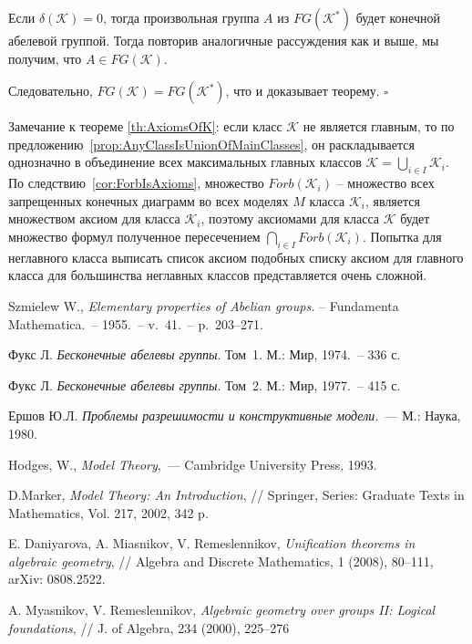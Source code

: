 \documentclass[a4paper,11pt,twoside]{article}
\def\K{{\mathcal{K}}}
\begin{document}
Если $\delta(\K) = 0$, тогда произвольная группа $A$ из $FG(\K^*)$ будет конечной абелевой группой. Тогда повторив аналогичные рассуждения как и выше, мы получим, что $A \in FG(\K)$.

Следовательно, $FG(\K) = FG(\K^*)$, что и доказывает теорему. $\square$

Замечание к теореме \ref{th:AxiomsOfK}: если класс $\K$ не является главным, то по предложению~\ref{prop:AnyClassIsUnionOfMainClasses}, он раскладывается однозначно в объединение всех максимальных главных классов $\K = \bigcup\limits_{i \in I} \K_i$. По следствию~\ref{cor:ForbIsAxioms}, множество $Forb(\K_i)$ -- множество всех запрещенных конечных диаграмм во всех моделях $M$ класса $\K_i$, является множеством аксиом для класса $\K_i$, поэтому аксиомами для класса $\K$ будет множество формул полученное пересечением $\bigcap\limits_{i \in I} Forb(\K_i)$. Попытка для неглавного класса выписать список аксиом подобных списку аксиом для главного класса для большинства неглавных классов представляется очень сложной.

\begin{thebibliography}{}

 Szmielew W., \textit{Elementary properties of Abelian groups.} -- Fundamenta Mathematica.~-- 1955.~-- v.~41.~-- p.~203--271.

 Фукс Л. \textit{Бесконечные абелевы группы}. Том~1. М.: Мир, 1974.~-- 336 с.

 Фукс Л. \textit{Бесконечные абелевы группы}. Том~2. М.: Мир, 1977.~-- 415 с.

 Ершов Ю.Л. \textit{Проблемы разрешимости и конструктивные модели.}~--- М.: Наука, 1980.

 Hodges, W., \textit{Model Theory},~--- Cambridge University Press, 1993. 

 D.Marker, \textit{Model Theory: An Introduction}, // Springer, Series: Graduate Texts in Mathematics, Vol. 217, 2002, 342 p.

 E. Daniyarova, A. Miasnikov, V. Remeslennikov, \textit{Unification theorems in algebraic geometry}, // Algebra and Discrete Mathematics, 1 (2008), 80--111, arXiv: 0808.2522.

 A. Myasnikov, V. Remeslennikov, \textit{Algebraic geometry over groups II: Logical foundations}, // J. of Algebra, 234 (2000), 225--276

\end{thebibliography}
\end{document}
